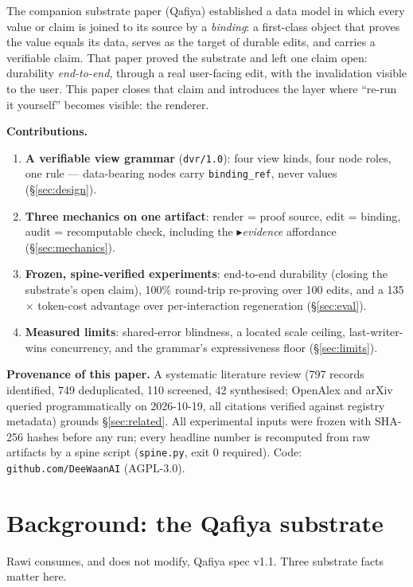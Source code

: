 \documentclass[11pt]{article}
\newcommand{\ev}{\ensuremath{\blacktriangleright}}
\begin{document}
The companion substrate paper (Qafiya) established a data model in which every value or
claim is joined to its source by a \emph{binding}: a first-class object that proves the
value equals its data, serves as the target of durable edits, and carries a verifiable
claim. That paper proved the substrate and left one claim open: durability
\emph{end-to-end}, through a real user-facing edit, with the invalidation visible to the
user. This paper closes that claim and introduces the layer where ``re-run it yourself''
becomes visible: the renderer.

\textbf{Contributions.}
\begin{enumerate}
  \item \textbf{A verifiable view grammar} (\texttt{dvr/1.0}): four view kinds, four node
        roles, one rule --- data-bearing nodes carry \texttt{binding\_ref}, never values
        (\S\ref{sec:design}).
  \item \textbf{Three mechanics on one artifact}: render = proof source, edit = binding,
        audit = recomputable check, including the \emph{\ev evidence} affordance
        (\S\ref{sec:mechanics}).
  \item \textbf{Frozen, spine-verified experiments}: end-to-end durability (closing the
        substrate's open claim), 100\% round-trip re-proving over 100 edits, and a
        135$\times$ token-cost advantage over per-interaction regeneration
        (\S\ref{sec:eval}).
  \item \textbf{Measured limits}: shared-error blindness, a located scale ceiling,
        last-writer-wins concurrency, and the grammar's expressiveness floor
        (\S\ref{sec:limits}).
\end{enumerate}

\textbf{Provenance of this paper.} A systematic literature review (797 records identified,
749 deduplicated, 110 screened, 42 synthesised; OpenAlex and arXiv queried
programmatically on 2026-10-19, all citations verified against registry metadata)
grounds \S\ref{sec:related}. All experimental inputs were frozen with SHA-256 hashes
before any run; every headline number is recomputed from raw artifacts by a spine script
(\texttt{spine.py}, exit 0 required). Code: \texttt{github.com/DeeWaanAI} (AGPL-3.0).

\section{Background: the Qafiya substrate}

Rawi consumes, and does not modify, Qafiya spec v1.1. Three substrate facts matter here.
\end{document}
